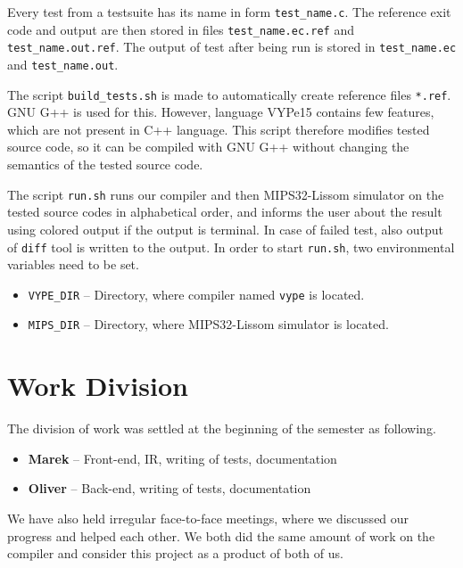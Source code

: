 \documentclass[12pt]{article}
\begin{document}
Every test from a testsuite has its name in form \texttt{test\_name.c}. The reference exit code and output are then stored in files
\texttt{test\_name.ec.ref} and \texttt{test\_name.out.ref}. The output of test after being run is stored in \texttt{test\_name.ec}
and \texttt{test\_name.out}.

The script \texttt{build\_tests.sh} is made to automatically create reference files \texttt{*.ref}. GNU G++ is used for this. However,
language VYPe15 contains few features, which are not present in C++ language. This script therefore modifies tested source code,
so it can be compiled with GNU G++ without changing the semantics of the tested source code.

The script \texttt{run.sh} runs our compiler and then MIPS32-Lissom simulator on the tested source codes in alphabetical order, and informs the user about the result
using colored output if the output is terminal. In case of failed test, also output of \texttt{diff} tool is written to the output.
In order to start \texttt{run.sh}, two environmental variables need to be set.
\begin{itemize}
	\item \texttt{VYPE\_DIR} -- Directory, where compiler named \texttt{vype} is located.
	\item \texttt{MIPS\_DIR} -- Directory, where MIPS32-Lissom simulator is located.
\end{itemize}

\section{Work Division}
The division of work was settled at the beginning of the semester as following.
\begin{itemize}
	\item \textbf{Marek} -- Front-end, IR, writing of tests, documentation
	\item \textbf{Oliver} -- Back-end, writing of tests, documentation
\end{itemize}

We have also held irregular face-to-face meetings, where we discussed our progress and helped each other.
We both did the same amount of work on the compiler and consider this project as a product of both of us.

\clearpage

\begin{flushleft}
	
\end{flushleft}
\end{document}
